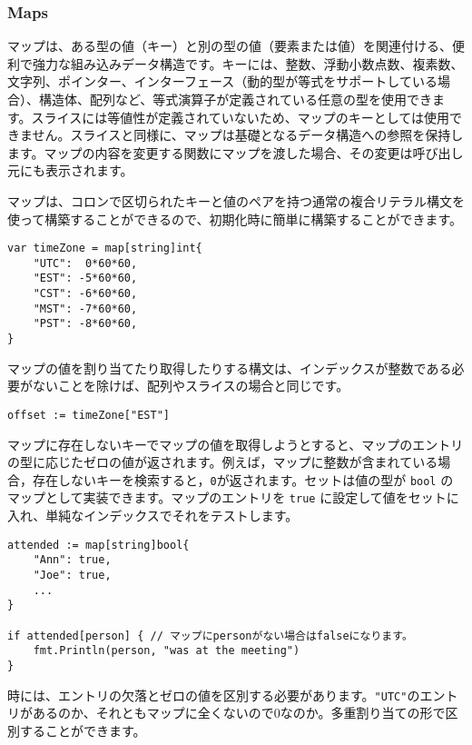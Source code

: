 \documentclass{jsarticle}
\begin{document}
\subsubsection{Maps}

マップは、ある型の値（キー）と別の型の値（要素または値）を関連付ける、便利で強力な組み込みデータ構造です。キーには、整数、浮動小数点数、複素数、文字列、ポインター、インターフェース（動的型が等式をサポートしている場合）、構造体、配列など、等式演算子が定義されている任意の型を使用できます。スライスには等値性が定義されていないため、マップのキーとしては使用できません。スライスと同様に、マップは基礎となるデータ構造への参照を保持します。マップの内容を変更する関数にマップを渡した場合、その変更は呼び出し元にも表示されます。

マップは、コロンで区切られたキーと値のペアを持つ通常の複合リテラル構文を使って構築することができるので、初期化時に簡単に構築することができます。

\begin{lstlisting}[numbers=none]
var timeZone = map[string]int{
    "UTC":  0*60*60,
    "EST": -5*60*60,
    "CST": -6*60*60,
    "MST": -7*60*60,
    "PST": -8*60*60,
}
\end{lstlisting}

マップの値を割り当てたり取得したりする構文は、インデックスが整数である必要がないことを除けば、配列やスライスの場合と同じです。

\begin{lstlisting}[numbers=none]
offset := timeZone["EST"]
\end{lstlisting}

マップに存在しないキーでマップの値を取得しようとすると、マップのエントリの型に応じたゼロの値が返されます。例えば，マップに整数が含まれている場合，存在しないキーを検索すると，\texttt{0}が返されます。セットは値の型が
\texttt{bool} のマップとして実装できます。マップのエントリを
\texttt{true}
に設定して値をセットに入れ、単純なインデックスでそれをテストします。

\begin{lstlisting}[numbers=none]
attended := map[string]bool{
    "Ann": true,
    "Joe": true,
    ...
}

if attended[person] { // マップにpersonがない場合はfalseになります。
    fmt.Println(person, "was at the meeting")
}
\end{lstlisting}

時には、エントリの欠落とゼロの値を区別する必要があります。\texttt{"UTC"}のエントリがあるのか、それともマップに全くないので0なのか。多重割り当ての形で区別することができます。
\end{document}

